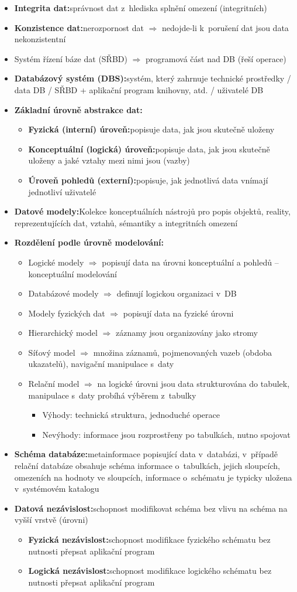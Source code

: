 \documentclass[a4paper,10pt]{article}
\newcommand{\pojem}[2]{\item \textbf{#1:}\quad #2}
\newcommand{\tedy}{$\Rightarrow$ }
\begin{document}
\begin{itemize}
			\pojem{Integrita dat}{správnost dat z~hlediska splnění omezení (integritních)}
			\pojem{Konzistence dat}{nerozpornost dat \tedy nedojde-li k~porušení dat jsou data nekonzistentní}
			\item Systém řízení báze dat (SŘBD) \tedy programová část nad DB (řeší operace)
			\pojem{Databázový systém (DBS)}{systém, který zahrnuje technické prostředky / data DB / SŘBD + aplikační program knihovny, atd. / uživatelé DB}
			\pojem{Základní úrovně abstrakce dat}
			\begin{itemize}
				\pojem{Fyzická (interní) úroveň}{popisuje data, jak jsou skutečně uloženy}
				\pojem{Konceptuální (logická) úroveň}{popisuje data, jak jsou skutečně uloženy a jaké vztahy mezi nimi jsou (vazby)}
				\pojem{Úroveň pohledů (externí)}{popisuje, jak jednotlivá data vnímají jednotliví uživatelé}
			\end{itemize}
			\pojem{Datové modely}{Kolekce konceptuálních nástrojů pro popis objektů, reality, reprezentujících dat, vztahů, sémantiky a integritních omezení}
			\pojem{Rozdělení podle úrovně modelování}
			\begin{itemize}
				\item Logické modely \tedy popisují data na úrovni konceptuální a pohledů -- konceptuální modelování
				\item Databázové modely \tedy definují logickou organizaci v~DB
				\item Modely fyzických dat \tedy popisují data na fyzické úrovni
				\item Hierarchický model \tedy záznamy jsou organizovány jako stromy
				\item Síťový model \tedy množina záznamů, pojmenovaných vazeb (obdoba ukazatelů), navigační manipulace s~daty
				\item Relační model \tedy na logické úrovni jsou data strukturována do tabulek, manipulace s~daty probíhá výběrem z~tabulky
				\begin{itemize}
					\item Výhody: technická struktura, jednoduché operace
					\item Nevýhody: informace jsou rozprostřeny po tabulkách, nutno spojovat
				\end{itemize}
			\end{itemize}

			\pojem{Schéma databáze}{metainformace popisující data v~databázi, v~případě relační databáze obsahuje schéma informace o~tabulkách, jejich sloupcích, omezeních na hodnoty ve sloupcích, informace o~schématu je typicky uložena v~systémovém katalogu}
			\pojem{Datová nezávislost}{schopnost modifikovat schéma bez vlivu na schéma na vyšší vrstvě (úrovni)}
			\begin{itemize}
				\pojem{Fyzická nezávislost}{schopnost modifikace fyzického schématu bez nutnosti přepsat aplikační program}
				\pojem{Logická nezávislost}{schopnost modifikace logického schématu bez nutnosti přepsat aplikační program}
			\end{itemize}
		\end{itemize}
		
\end{document}
